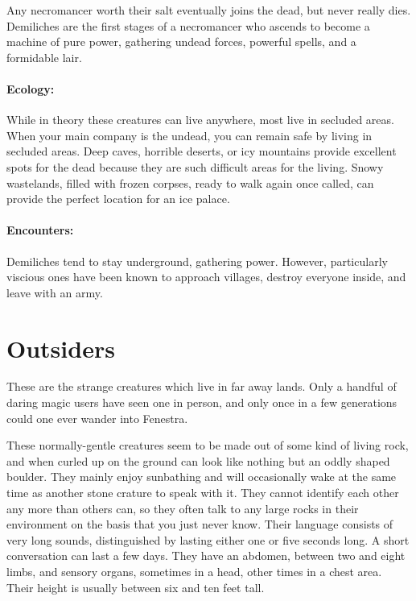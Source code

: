\label{demilich}

Any necromancer worth their salt eventually joins the dead, but never really dies.  Demiliches are the first stages of a necromancer who ascends to become a machine of pure power, gathering undead forces, powerful spells, and a formidable lair.

\demilich

\paragraph{Ecology:} While in theory these creatures can live anywhere, most live in secluded areas.  When your main company is the undead, you can remain safe by living in secluded areas.  Deep caves, horrible deserts, or icy mountains provide excellent spots for the dead because they are such difficult areas for the living.  Snowy wastelands, filled with frozen corpses, ready to walk again once called, can provide the perfect location for an ice palace.

\paragraph{Encounters:} Demiliches tend to stay underground, gathering power.  However, particularly viscious ones have been known to approach villages, destroy everyone inside, and leave with an army.

\section{Outsiders}

These are the strange creatures which live in far away lands.  Only a handful of daring magic users have seen one in person, and only once in a few generations could one ever wander into Fenestra.

\label{rockman}

\rockman

These normally-gentle creatures seem to be made out of some kind of living rock, and when curled up on the ground can look like nothing but an oddly shaped boulder.  They mainly enjoy sunbathing and will occasionally wake at the same time as another stone crature to speak with it.  They cannot identify each other any more than others can, so they often talk to any large rocks in their environment on the basis that you just never know.  Their language consists of very long sounds, distinguished by lasting either one or five seconds long.  A short conversation can last a few days.  They have an abdomen, between two and eight limbs, and sensory organs, sometimes in a head, other times in a chest area.  Their height is usually between six and ten feet tall.

